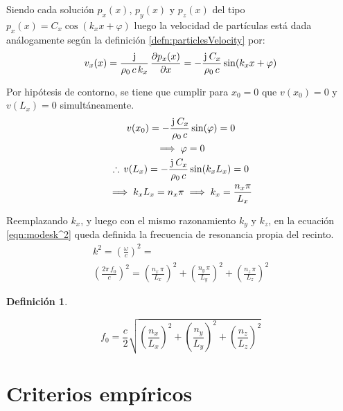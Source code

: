 \documentclass[a5paper,12pt,twoside]{book}
\newtheorem{defn}{{Definición}}[chapter]
\begin{document}
Siendo cada solución $p_x(x)$, $p_y(x)$ y $p_z(x)$ del tipo $p_x(x) = C_x \cos (k_x x + \varphi)$ luego la velocidad de partículas está dada análogamente según la definición \ref{defn:particlesVelocity} por:
\begin{equation*}
    v_x(x) = \frac{\mkern2mu\mathrm{j}\mkern1mu}{\rho_0 \, c \, k_x} \, \frac{\partial p_x(x)}{\partial x} = - \frac{\mkern2mu\mathrm{j}\mkern1mu \, C_x}{\rho_0 \, c} \sin (k_x x + \varphi)
\end{equation*}

Por hipótesis de contorno, se tiene que cumplir para $x_0=0$ que $v(x_0) = 0$ y $v(L_x) = 0$ simultáneamente.
\begin{gather*}
    v(x_0) = - \frac{\mkern2mu\mathrm{j}\mkern1mu \, C_x}{\rho_0 \, c} \sin (\varphi) = 0
    \\
    \implies \varphi = 0
    \\
    \therefore \, v(L_x) = - \frac{\mkern2mu\mathrm{j}\mkern1mu \, C_x}{\rho_0 \, c} \sin (k_x L_x) = 0
    \\
    \implies k_x L_x = n_x \pi \implies k_x = \frac{n_x \pi}{L_x}
\end{gather*}

Reemplazando $k_x$, y luego con el mismo razonamiento $k_y$ y $k_z$, en la ecuación \ref{eqn:modesk^2} queda definida la frecuencia de resonancia propia del recinto.
\begin{gather*}
    k^2 = \left( \frac{\omega}{c} \right)^2 =
    \\
    \left( \frac{2\pi\,f_0}{c} \right)^2
    = \left( \frac{n_x \, \pi}{L_x} \right)^2 + \left( \frac{n_y \, \pi}{L_y} \right)^2 + \left( \frac{n_z \, \pi}{L_z} \right)^2
\end{gather*}

\begin{mdframed}[style=DefinitionFrame]
    \begin{defn}
    \end{defn}
    \begin{equation*}
        f_0 = \frac{c}{2} \sqrt{\left(\frac{n_x}{L_x}\right)^2 + \left(\frac{n_y}{L_y}\right)^2 + \left(\frac{n_z}{L_z}\right)^2}
    \end{equation*}
\end{mdframed}


\section{Criterios empíricos}
\end{document}
